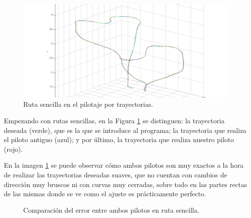 \begin{figure}[H]
	\begin{center}
		\includegraphics[width=1.1\textwidth]{imag/IMG40.png}
				\caption{Ruta sencilla en el pilotaje por trayectorias.}
		\label{fig:Ruta sencilla en trayectoria.}	
	\end{center}
\end{figure}

\hspace{1cm} Empezando con rutas sencillas, en la Figura \ref{fig:Ruta sencilla en trayectoria.} se distinguen: la trayectoria deseada (verde), que es la que se introduce al programa; la trayectoria que realiza el piloto antiguo (azul); y por último, la trayectoria que realiza nuestro piloto (rojo).

\hspace{1cm} En la imagen \ref{fig:Ruta sencilla en trayectoria.} se puede observar cómo ambos pilotos son muy exactos a la hora de realizar las trayectorias deseadas suaves, que no cuentan con cambios de dirección muy bruscos ni con curvas muy cerradas, sobre todo en las partes rectas de las mismas donde se ve como el ajuste es prácticamente perfecto.

\begin{figure}[H]
 \centering
 \caption{Comparación del error entre ambos pilotos en ruta sencilla.}
 \label{f:Comparativa del error sencilla.}
\end{figure} 
 
